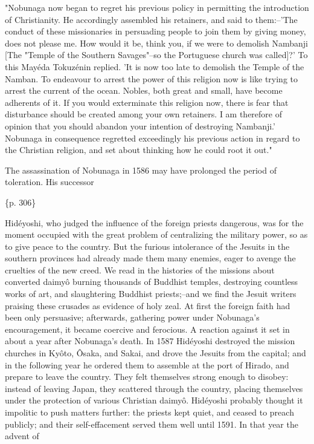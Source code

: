 "Nobunaga now began to regret his previous policy in permitting the introduction of Christianity. He accordingly assembled his retainers, and said to them:--'The conduct of these missionaries in persuading people to join them by giving money, does not please me. How would it be, think you, if we were to demolish Nambanji [The "Temple of the Southern Savages"--so the Portuguese church was called]?' To this Mayéda Tokuzénin replied. 'It is now too late to demolish the Temple of the Namban. To endeavour to arrest the power of this religion now is like trying to arrest the current of the ocean. Nobles, both great and small, have become adherents of it. If you would exterminate this religion now, there is fear that disturbance should be created among your own retainers. I am therefore of opinion that you should abandon your intention of destroying Nambanji.' Nobunaga in consequence regretted exceedingly his previous action in regard to the Christian religion, and set about thinking how he could root it out."

The assassination of Nobunaga in 1586 may have prolonged the period of toleration. His successor

\{p. 306\}

Hidéyoshi, who judged the influence of the foreign priests dangerous, was for the moment occupied with the great problem of centralizing the military power, so as to give peace to the country. But the furious intolerance of the Jesuits in the southern provinces had already made them many enemies, eager to avenge the cruelties of the new creed. We read in the histories of the missions about converted daimyô burning thousands of Buddhist temples, destroying countless works of art, and slaughtering Buddhist priests;--and we find the Jesuit writers praising these crusades as evidence of holy zeal. At first the foreign faith had been only persuasive; afterwards, gathering power under Nobunaga's encouragement, it became coercive and ferocious. A reaction against it set in about a year after Nobunaga's death. In 1587 Hidéyoshi destroyed the mission churches in Kyôto, Ôsaka, and Sakai, and drove the Jesuits from the capital; and in the following year he ordered them to assemble at the port of Hirado, and prepare to leave the country. They felt themselves strong enough to disobey: instead of leaving Japan, they scattered through the country, placing themselves under the protection of various Christian daimyô. Hidéyoshi probably thought it impolitic to push matters further: the priests kept quiet, and ceased to preach publicly; and their self-effacement served them well until 1591. In that year the advent of

